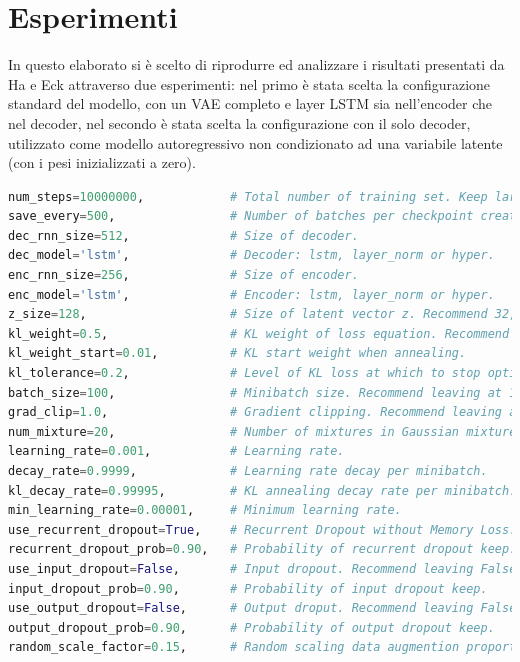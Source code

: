 \begin{minipage}{\linewidth}
\section{Esperimenti} %
\label{sec:esperimenti}
In questo elaborato si è scelto di riprodurre ed analizzare i risultati presentati da Ha e Eck attraverso due esperimenti: nel primo è stata scelta la configurazione standard del modello, con un VAE completo e layer LSTM sia nell'encoder che nel decoder, nel secondo è stata scelta la configurazione con il solo decoder, utilizzato come modello autoregressivo non condizionato ad una variabile latente (con i pesi inizializzati a zero). 
\begin{minipage}{\linewidth}
\begin{lstlisting}[language = Python, frame = single, caption = {Iperparametri standard di sketch-rnn}, label={iperparametri}, captionpos = b]
num_steps=10000000,            # Total number of training set. Keep large.
save_every=500,                # Number of batches per checkpoint creation.
dec_rnn_size=512,              # Size of decoder.
dec_model='lstm',              # Decoder: lstm, layer_norm or hyper.
enc_rnn_size=256,              # Size of encoder.
enc_model='lstm',              # Encoder: lstm, layer_norm or hyper.
z_size=128,                    # Size of latent vector z. Recommend 32, 64 or 128.
kl_weight=0.5,                 # KL weight of loss equation. Recommend 0.5 or 1.0.
kl_weight_start=0.01,          # KL start weight when annealing.
kl_tolerance=0.2,              # Level of KL loss at which to stop optimizing for KL.
batch_size=100,                # Minibatch size. Recommend leaving at 100.
grad_clip=1.0,                 # Gradient clipping. Recommend leaving at 1.0.
num_mixture=20,                # Number of mixtures in Gaussian mixture model.
learning_rate=0.001,           # Learning rate.
decay_rate=0.9999,             # Learning rate decay per minibatch.
kl_decay_rate=0.99995,         # KL annealing decay rate per minibatch.
min_learning_rate=0.00001,     # Minimum learning rate.
use_recurrent_dropout=True,    # Recurrent Dropout without Memory Loss. Recomended.
recurrent_dropout_prob=0.90,   # Probability of recurrent dropout keep.
use_input_dropout=False,       # Input dropout. Recommend leaving False.
input_dropout_prob=0.90,       # Probability of input dropout keep.
use_output_dropout=False,      # Output droput. Recommend leaving False.
output_dropout_prob=0.90,      # Probability of output dropout keep.
random_scale_factor=0.15,      # Random scaling data augmention proportion.

\end{lstlisting}
\end{minipage}
\end{minipage}
